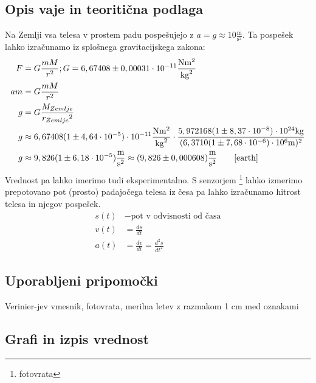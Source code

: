 \documentclass[12pt]{article}
\begin{document}
 	\subsection*{Opis vaje in teoritična podlaga}
	Na Zemlji vsa telesa v prostem padu pospešujejo z $ a = g \approx 10 \frac{\text{m}}{{\text{s}}^2}$.
	Ta pospešek lahko izračunamo iz splošnega gravitacijskega zakona:
	\begin{equation}
		\label{gravity}
		\begin{split}
			F &= G \frac{mM}{r^2}; G = 6,67408 \pm 0,00031 \cdot 10^{-11} \frac{\text{N}\text{m}^2}{\text{kg}^2} \\
			a m &= G \frac{mM}{r^2} \\
			g &= G \frac{M_{Zemlje}}{{r_{Zemlje}}^2} \\
			g &\approx 6,67408 (1 \pm 4,64 \cdot 10^{-5}) \cdot 10^{-11} \frac{\text{N}\text{m}^2}{\text{kg}^2} \cdot \frac{5,972168 (1 \pm 8,37 \cdot 10 ^{-8}) \cdot 10^{24} \text{kg} }{(6,3710 (1 \pm 7,68 \cdot 10^{-6}) \cdot 10^6 \text{m}) ^2} \\
			g &\approx 9,826 (1 \pm 6,18 \cdot 10^{-5}) \frac{\text{m}}{\text{s}^2} \approx (9,826 \pm 0,000608) \frac{\text{m}}{\text{s}^2} \qquad \mbox{\cite{earth}}
		\end{split}
	\end{equation}
	Vrednost pa lahko imerimo tudi eksperimentalno. S senzorjem \footnote{fotovrata} lahko
	izmerimo prepotovano pot (prosto) padajočega telesa iz česa pa lahko izračunamo hitrost
	telesa in njegov pospešek.
	\begin{equation}
		\begin{split}
			s(t) &- \text{pot v odvisnosti od časa} \\
			v(t) &= \frac{ds}{dt} \\
			a(t) &= \frac{dv}{dt} = \frac{d^2s}{{dt}^2}
		\end{split}	
	\end{equation}


 	\subsection*{Uporabljeni pripomočki}
	Verinier-jev vmesnik, fotovrata, merilna letev z razmakom 1 cm med oznakami
	\vspace{\fill}

 	\subsection*{Grafi in izpis vrednost}
\end{document}

